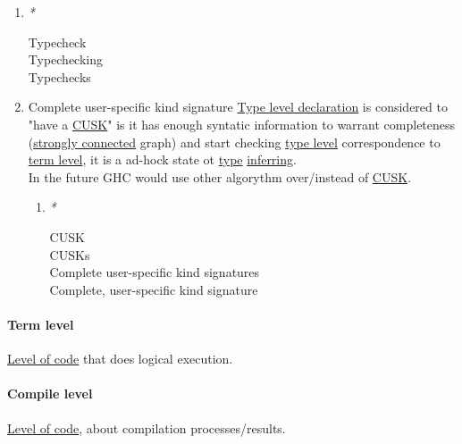 \documentclass[11pt]{article}
\begin{document}
\begin{enumerate}
\item \emph{*}
\label{sec:org6f62c02}

\label{org96ca7c4}Typecheck\\
\label{org84c913f}Typechecking\\
\label{org58a3de1}Typechecks\\

\item \label{orgdafd0e0}Complete user-specific kind signature
\label{sec:orgcf3f297}
\hyperref[orga7c5019]{Type level declaration} is considered to "have a \hyperref[orgc7a6e4b]{CUSK}" is it has enough syntatic information to warrant completeness (\hyperref[orgc84d9f9]{strongly connected} graph) and start checking \hyperref[org01e5da3]{type level} correspondence to \hyperref[org3e856cf]{term level}, it is a ad-hock state ot \hyperref[org4fbaeb8]{type} \hyperref[org0225832]{inferring}.\\

In the future GHC would use other algorythm over/instead of \hyperref[orgc7a6e4b]{CUSK}.\\

\begin{enumerate}
\item \emph{*}
\label{sec:org2bf4a77}

\label{orgc7a6e4b}CUSK\\
\label{orgea5d95d}CUSKs\\
\label{org5a5c78a}Complete user-specific kind signatures\\
\label{org6a091f2}Complete, user-specific kind signature\\
\end{enumerate}
\end{enumerate}

\paragraph{\label{org3e856cf}Term level}
\label{sec:org2e617e6}
\hyperref[org8bd4e7d]{Level of code} that does logical execution.\\

\paragraph{\label{org49a28ea}Compile level}
\label{sec:org6ebedf5}
\hyperref[org8bd4e7d]{Level of code}, about compilation processes/results.\\
\end{document}
